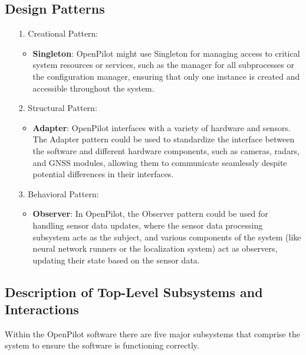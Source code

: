 \documentclass[12pt]{article}
\begin{document}
\subsection{Design Patterns}
\begin{itemize}
    \item[1.] Creational Pattern:
        \begin{itemize}
            \item \textbf{Singleton}:
            OpenPilot might use Singleton for managing access to critical system resources or services, such as the manager for all subprocesses or the configuration manager, ensuring that only one instance is created and accessible throughout the system.
        \end{itemize}

    \item[2.] Structural Pattern:
        \begin{itemize}
            \item \textbf{Adapter}:
            OpenPilot interfaces with a variety of hardware and sensors. The Adapter pattern could be used to standardize the interface between the software and different hardware components, such as cameras, radars, and GNSS modules, allowing them to communicate seamlessly despite potential differences in their interfaces.
        \end{itemize}

     \item[3.] Behavioral Pattern:
        \begin{itemize}
            \item \textbf{Observer}:
            In OpenPilot, the Observer pattern could be used for handling sensor data updates, where the sensor data processing subsystem acts as the subject, and various components of the system (like neural network runners or the localization system) act as observers, updating their state based on the sensor data.
        \end{itemize}

\end{itemize}

\subsection{Description of Top-Level Subsystems and Interactions}

Within the OpenPilot software there are five major subsystems that comprise the system to ensure the software is functioning correctly. 
\end{document}
